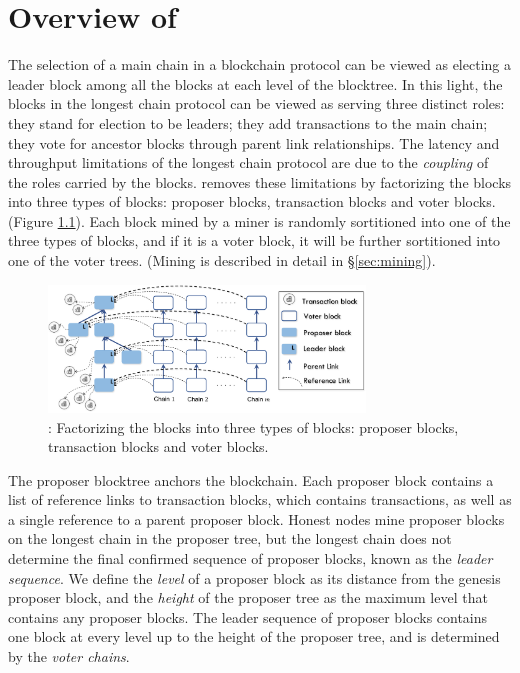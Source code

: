 
\chapter{Overview of \prism}
\label{sec:overview}


The selection of a main chain in a blockchain protocol can be viewed as electing a leader block among all the blocks at each level of the blocktree. In this light, the blocks in the longest chain protocol can be viewed as serving three distinct roles: they stand for election to be leaders;  they add transactions to the main chain; they vote for ancestor blocks through parent link relationships. The latency and throughput limitations of the longest chain protocol are due to the {\em coupling} of the roles carried by the blocks. \prism removes these limitations by factorizing the blocks into three types of blocks: proposer blocks, transaction blocks and voter blocks. (Figure \ref{fig:prism}). Each block mined by a miner is randomly sortitioned into one of the three types of blocks, and if it is a voter block, it will be further  sortitioned into one of the voter trees. (Mining is described in detail in \S\ref{sec:mining}).

\begin{figure}
\begin{center}
\includegraphics[width=0.75\textwidth]{figures/Prism_main.pdf}
\end{center}
    \caption[Prism factors the blocks into three types of blocks.]{\prism: Factorizing the blocks into three types of blocks: proposer blocks, transaction blocks and voter blocks.}
\label{fig:prism}
\end{figure}

The proposer blocktree anchors the \prism blockchain. 
Each proposer block contains a list of reference links to transaction blocks, which contains transactions, as well as a single reference to a parent proposer block.
Honest nodes mine proposer blocks on the longest chain in the proposer tree, but the longest chain does not determine the final confirmed sequence of proposer blocks, known as the  \emph{leader sequence}. 
We define the \emph{level} of a proposer block as its distance from the genesis proposer block, and the \emph{height} of the proposer tree as the maximum level that contains any proposer blocks. 
The leader sequence of proposer blocks contains one block at every level up to the height of the proposer tree, and is  determined by the \emph{voter chains}. 


